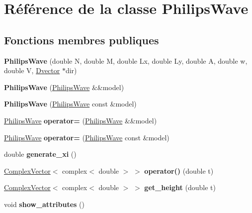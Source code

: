 \hypertarget{class_philips_wave}{}\section{Référence de la classe Philips\+Wave}
\label{class_philips_wave}
\subsection*{Fonctions membres publiques}
\begin{DoxyCompactItemize}
\item 
\mbox{\label{class_philips_wave_a12dc8ad91f043c188d8bb493302d8a38}} 
{\bfseries Philips\+Wave} (double N, double M, double Lx, double Ly, double A, double w, double V, \hyperlink{class_dvector}{Dvector} $\ast$dir)
\item 
\mbox{\label{class_philips_wave_aa560ae0388726db85b603e10ac828ceb}} 
{\bfseries Philips\+Wave} (\hyperlink{class_philips_wave}{Philips\+Wave} \&\&model)
\item 
\mbox{\label{class_philips_wave_ac1914d1a88cccc1fb4e0480374dcb6f7}} 
{\bfseries Philips\+Wave} (\hyperlink{class_philips_wave}{Philips\+Wave} const \&model)
\item 
\mbox{\label{class_philips_wave_aa186cd8f9dbd67ec4a5aaaf69c3113d0}} 
\hyperlink{class_philips_wave}{Philips\+Wave} {\bfseries operator=} (\hyperlink{class_philips_wave}{Philips\+Wave} \&\&model)
\item 
\mbox{\label{class_philips_wave_ae9d979f7458a8d33d2643a84b770bac4}} 
\hyperlink{class_philips_wave}{Philips\+Wave} {\bfseries operator=} (\hyperlink{class_philips_wave}{Philips\+Wave} const \&model)
\item 
\mbox{\label{class_philips_wave_a29cfd8f1440240b83c50e07731dfee3a}} 
double {\bfseries generate\+\_\+xi} ()
\item 
\mbox{\label{class_philips_wave_a3b4621858e0b51b46f8f32ca81daa22e}} 
\hyperlink{class_complex_vector}{Complex\+Vector}$<$ complex$<$ double $>$ $>$ {\bfseries operator()} (double t)
\item 
\mbox{\label{class_philips_wave_a6399084b40c8252cebe8477b3893786c}} 
\hyperlink{class_complex_vector}{Complex\+Vector}$<$ complex$<$ double $>$ $>$ {\bfseries get\+\_\+height} (double t)
\item 
\mbox{\label{class_philips_wave_a63974a053c9795709cce3feb5cc7906c}} 
void {\bfseries show\+\_\+attributes} ()
\end{DoxyCompactItemize}


